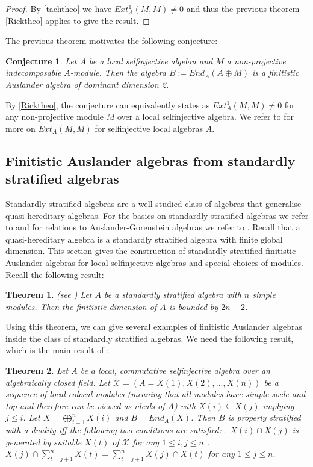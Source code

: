 \documentclass[a4paper]{amsart}
\newtheorem{theorem}{Theorem}[section]
\newtheorem*{conjecture}{Conjecture}
\theoremstyle{definition}
\theoremstyle{remark}
\numberwithin{equation}{theorem}
\begin{document}
\begin{proof}
By \ref{tachtheo} we have $Ext_A^1(M,M) \neq 0$ and thus the previous theorem \ref{Ricktheo} applies to give the result.

\end{proof}
The previous theorem motivates the following conjecture:
\begin{conjecture}
Let $A$ be a local selfinjective algebra and $M$ a non-projective indecomposable $A$-module. Then the algebra $B:=End_A(A \oplus M)$ is a finitistic Auslander algebra of dominant dimension 2.

\end{conjecture}
By \ref{Ricktheo}, the conjecture can equivalently states as $Ext_A^1(M,M) \neq 0$ for any non-projective module $M$ over a local selfinjective algebra.
We refer to \cite{Mar4} for more on $Ext_A^1(M,M)$ for selfinjective local algebras $A$.




\subsection{Finitistic Auslander algebras from standardly stratified algebras}
Standardly stratified algebras are a well studied class of algebras that generalise quasi-hereditary algebras.
For the basics on standardly stratified algebras we refer to \cite{Rei} and for relations to Auslander-Gorenstein algebras we refer to \cite{Mar3}. Recall that a quasi-hereditary algebra is a standardly stratified algebra with finite global dimension. This section gives the construction of standardly stratified finitistic Auslander algebras for local selfinjective algebras and special choices of modules.
Recall the following result:
\begin{theorem} \label{standstratfindimbound}
(see \cite{AHLU})
Let $A$ be a standardly stratified algebra with $n$ simple modules. Then the finitistic dimension of $A$ is bounded by $2n-2$.
\end{theorem}


Using this theorem, we can give several examples of finitistic Auslander algebras inside the class of standardly stratified algebras. We need the following result, which is the main result of \cite{CheDl}:
\begin{theorem}
\label{chedlabtheo}
 Let $A$ be a local, commutative selfinjective algebra over an algebraically closed field. Let $\mathcal{X}=(A=X(1),X(2),...,X(n))$ be a sequence of local-colocal modules (meaning that all modules have simple socle and top and therefore can be viewed as ideals of $A$) with $X(i) \subseteq X(j)$ implying $j \leq i$. Let $X= \bigoplus\limits_{i=1}^{n}{X(i)}$ and $B=End_A(X)$. Then $B$ is properly stratified with a duality iff the following two conditions are satisfied:  . $X(i) \cap X(j)$ is generated by suitable $X(t)$ of $\mathcal{X}$ for any $1 \leq i,j \leq n$ . $X(j) \cap \sum\limits_{t=j+1}^{n}{X(t)}=\sum\limits_{t=j+1}^{n}{X(j) \cap X(t)}$ for any $1 \leq j \leq n$.
\end{theorem}
\end{document}
